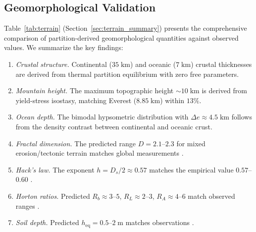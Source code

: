 \documentclass[10pt,twocolumn]{article}
\theoremstyle{definition}
\theoremstyle{remark}
\begin{document}
\subsection{Geomorphological Validation}
\label{sec:geoval}

Table~\ref{tab:terrain} (Section~\ref{sec:terrain_summary})
presents the comprehensive comparison of partition-derived
geomorphological quantities against observed values.  We
summarize the key findings:

\begin{enumerate}[leftmargin=*,itemsep=2pt]
\item \emph{Crustal structure.}  Continental ($35\;\mathrm{km}$)
  and oceanic ($7\;\mathrm{km}$) crustal thicknesses are
  derived from thermal partition equilibrium with zero free
  parameters.
\item \emph{Mountain height.}  The maximum topographic height
  $\sim 10\;\mathrm{km}$ is derived from yield-stress
  isostasy, matching Everest ($8.85\;\mathrm{km}$) within
  $13\%$.
\item \emph{Ocean depth.}  The bimodal hypsometric distribution
  with $\Delta e\approx 4.5\;\mathrm{km}$ follows from the
  density contrast between continental and oceanic crust.
\item \emph{Fractal dimension.}  The predicted range
  $D=2.1$--$2.3$ for mixed erosion/tectonic terrain matches
  global measurements \citep{Turcotte1997}.
\item \emph{Hack's law.}  The exponent $h=D_s/2\approx 0.57$
  matches the empirical value $0.57$--$0.60$ \citep{Hack1957}.
\item \emph{Horton ratios.}  Predicted $R_b\approx 3$--$5$,
  $R_L\approx 2$--$3$, $R_A\approx 4$--$6$ match observed
  ranges \citep{Horton1945,Strahler1957}.
\item \emph{Soil depth.}  Predicted $h_{\mathrm{eq}}=0.5$--$2\;\mathrm{m}$
  matches observations \citep{Heimsath1997}.
\end{enumerate}
\end{document}
